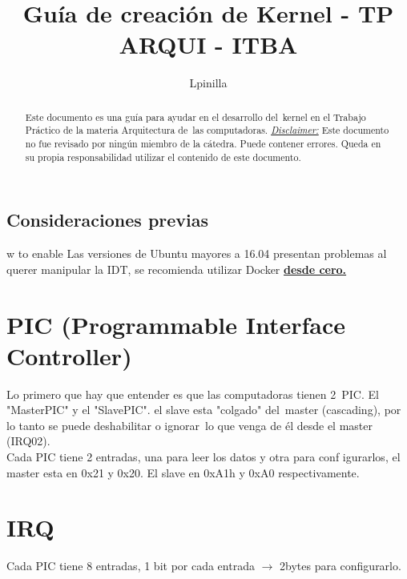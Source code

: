 \documentclass[]{article}
\title{Gu\'ia de creaci\'on de Kernel - TP ARQUI - ITBA}
\author{Lpinilla}
\begin{document}
\maketitle

\begin{abstract}
	Este documento es una guía para ayudar en el desarrollo del\
	kernel en el Trabajo Práctico de la materia Arquitectura de\
	las computadoras. 
	\underline{\textit{Disclaimer:}} Este documento no fue revisado por ning\'un miembro de la c\'atedra. Puede contener errores. Queda en su propia responsabilidad utilizar el contenido de este documento.
\end{abstract}

\subsection*{Consideraciones previas}w to enable
Las versiones de Ubuntu mayores a 16.04 presentan problemas al querer manipular la IDT, se recomienda utilizar Docker \textbf{\underline{desde cero.}}

\section*{PIC (Programmable Interface Controller)}
Lo primero que hay que entender es que las computadoras tienen 2\
PIC. El "MasterPIC" y el "SlavePIC". el slave esta "colgado" del\
master (cascading), por lo tanto se puede deshabilitar o ignorar\
lo que venga de él desde el master (IRQ02).\\
Cada PIC tiene 2 entradas, una para leer los datos y otra para conf
igurarlos, el master esta en 0x21 y 0x20. El slave en 0xA1h y 0xA0
respectivamente.

\section*{IRQ}
Cada PIC tiene 8 entradas, 1 bit por cada entrada $\longrightarrow$ 2bytes para configurarlo.
\end{document}
